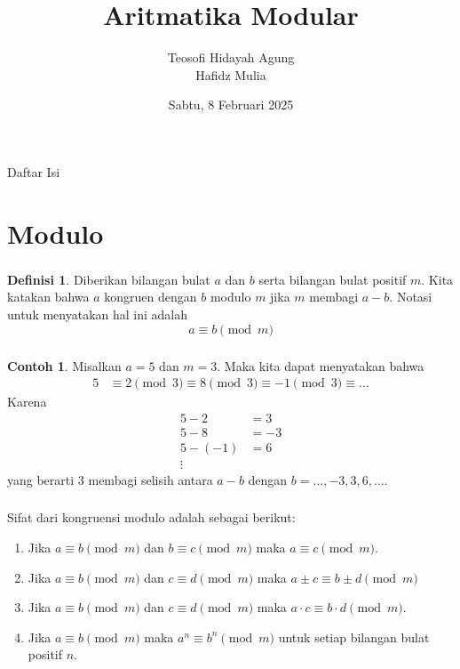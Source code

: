 \documentclass[aspectratio=169]{beamer}
\date{Sabtu, 8 Februari 2025}
\title[Aritmatika Modular]{Aritmatika Modular}
\author[Tew \& Haf]{Teosofi Hidayah Agung\\Hafidz Mulia}
\theoremstyle{definition}
\newtheorem{definisi}{Definisi}
\newtheorem{contoh}{Contoh}
\begin{document}
\begin{frame}
    \titlepage
\end{frame}

\begin{frame}{Daftar Isi}
    \tableofcontents
\end{frame}

\section{Modulo}

\begin{frame}
    \frametitle{\insertsection}
    \begin{definisi}
        Diberikan bilangan bulat $a$ dan $b$ serta bilangan bulat positif $m$. Kita katakan bahwa $a$ kongruen dengan $b$ modulo $m$ jika $m$ membagi $a-b$. Notasi untuk menyatakan hal ini adalah
        \[a\equiv b\pmod{m}\]
    \end{definisi}
\end{frame}

\begin{frame}
    \frametitle{\insertsection}
    \begin{contoh}
        Misalkan $a=5$ dan $m=3$. Maka kita dapat menyatakan bahwa
        \begin{align*}
            5&\equiv 2\pmod{3}\equiv 8\pmod{3}\equiv -1\pmod{3}\equiv \dots
        \end{align*}
        Karena
        \begin{align*}
            5-2&=3\\
            5-8&=-3\\
            5-(-1)&=6\\
            \vdots
        \end{align*}
        yang berarti $3$ membagi selisih antara $a-b$ dengan $b=...,-3,3,6,...$.
    \end{contoh}
\end{frame}

\begin{frame}
    \frametitle{\insertsection}
    Sifat dari kongruensi modulo adalah sebagai berikut:
    \begin{enumerate}
        \item Jika $a\equiv b\pmod{m}$ dan $b\equiv c\pmod{m}$ maka $a\equiv c\pmod{m}$.
        \item Jika $a\equiv b\pmod{m}$ dan $c\equiv d\pmod{m}$ maka $a\pm c\equiv b\pm d\pmod{m}$
        \item Jika $a\equiv b\pmod{m}$ dan $c\equiv d\pmod{m}$ maka $a\cdot c\equiv b\cdot d\pmod{m}$.
        \item Jika $a\equiv b\pmod{m}$ maka $a^n\equiv b^n\pmod{m}$ untuk setiap bilangan bulat positif $n$.
    \end{enumerate}
\end{frame}
\end{document}
